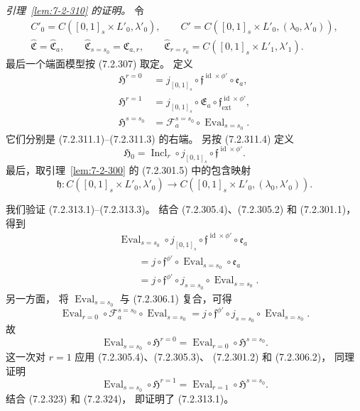 
\par\noindent\textit{引理~\ref{lem:7-2-310} 的证明。}
令
\[
\begin{gathered}
C'_0=C([0,1]_s\times L'_0,\lambda'_0),\qquad
C'=C([0,1]_s\times L'_0,(\lambda_0,\lambda'_0)),\\
\widehat{\mathfrak C}=\widehat{\mathfrak C}_a,\qquad
\widehat{\mathfrak C}_{s=s_0}=\mathfrak C_{a,r},\qquad
\widehat{\mathfrak C}_{r=r_0}
=C([0,1]_s\times L'_1,\lambda'_1).
\end{gathered}
\]
最后一个端面模型按 (7.2.307) 取定。
定义
\[
\begin{aligned}
\mathfrak H^{r=0}
&=j_{[0,1]_s}\circ
\mathfrak f^{\operatorname{id}\times\phi'}\circ\mathfrak e_a,\\
\mathfrak H^{r=1}
&=j_{[0,1]_s}\circ\mathfrak E_a\circ
\mathfrak f^{\operatorname{id}\times\phi'}_{\mathrm{ext}},\\
\mathfrak H^{s=s_0}
&=\mathcal F_a^{s=s_0}\circ\operatorname{Eval}_{s=s_0}.
\end{aligned}
\]
它们分别是 (7.2.311.1)--(7.2.311.3) 的右端。
另按 (7.2.311.4) 定义
\[
\mathfrak H_0
=\operatorname{Incl}_r\circ j_{[0,1]_s}
\circ\mathfrak f^{\operatorname{id}\times\phi'}.
\]
最后，取引理~\ref{lem:7-2-300}
的 (7.2.301.5) 中的包含映射
\[
\mathfrak h\colon
C([0,1]_s\times L'_0,\lambda'_0)
\longrightarrow
C([0,1]_s\times L'_0,(\lambda_0,\lambda'_0)).
\]

我们验证 (7.2.313.1)--(7.2.313.3)。
结合 (7.2.305.4)、(7.2.305.2)
和 (7.2.301.1)，得到
\[
\begin{aligned}
&\operatorname{Eval}_{s=s_0}\circ j_{[0,1]_s}
\circ\mathfrak f^{\operatorname{id}\times\phi'}
\circ\mathfrak e_a\\
&\qquad
=j\circ\mathfrak f^{\phi'}
\circ\operatorname{Eval}_{s=s_0}\circ\mathfrak e_a\\
&\qquad
=j\circ\mathfrak f^{\phi'}\circ j_{s=s_0}
\circ\operatorname{Eval}_{s=s_0}.
\end{aligned}
\]
另一方面，
将 $\operatorname{Eval}_{s=s_0}$
与 (7.2.306.1) 复合，可得
\[
\operatorname{Eval}_{r=0}\circ\mathcal F_a^{s=s_0}
\circ\operatorname{Eval}_{s=s_0}
=j\circ\mathfrak f^{\phi'}\circ j_{s=s_0}
\circ\operatorname{Eval}_{s=s_0}.
\]
故
\begin{equation}
\operatorname{Eval}_{s=s_0}\circ\mathfrak H^{r=0}
=\operatorname{Eval}_{r=0}\circ\mathfrak H^{s=s_0}.
\tag{7.2.323}\label{eq:7-2-323}
\end{equation}
这一次对 $r=1$ 应用
(7.2.305.4)、(7.2.305.3)、
(7.2.301.2) 和 (7.2.306.2)，
同理证明
\begin{equation}
\operatorname{Eval}_{s=s_0}\circ\mathfrak H^{r=1}
=\operatorname{Eval}_{r=1}\circ\mathfrak H^{s=s_0}.
\tag{7.2.324}\label{eq:7-2-324}
\end{equation}
结合 (7.2.323) 和 (7.2.324)，
即证明了 (7.2.313.1)。

